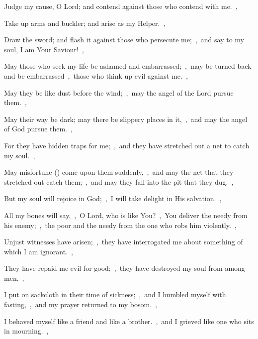 \documentclass[12pt,twoside,a5paper]{article}
\begin{document}



\begin{normalparskip}
  Judge my cause, O Lord; and contend against those who contend with me.~\sep

  Take up arms and buckler; and arise as my Helper.~\sep


  Draw the sword; and flash it against those who persecute me;~\sep\ and say to my soul, I am Your Saviour!~\sep

  May those who seek my life be ashamed and embarrassed;~\sep\ may be turned back and be embarrassed~\sep\ those who think up evil against me.~\sep

  May they be like dust before the wind;~\sep\ may the angel of the Lord pursue them.~\sep

  May their way be dark; may there be slippery places in it,~\sep\ and may the angel of God pursue them.~\sep

  For they have hidden traps for me;~\sep\ and they have stretched out a net to catch my soul.~\sep

  May misfortune () come upon them suddenly,~\sep\ and may the net that they stretched out catch them;~\sep\ and may they fall into the pit that they dug.~\sep

  But my soul will rejoice in God;~\sep\ I will take delight in His salvation.~\sep

  All my bones will say,~\sep\ O Lord, who is like You?~\sep\ You deliver the needy from his enemy;~\sep\ the poor and the needy from the one who robs him violently.~\sep

  Unjust witnesses have arisen;~\sep\ they have interrogated me about something of which I am ignorant.~\sep

  They have repaid me evil for good;~\sep\ they have destroyed my soul from among men.~\sep

  I put on sackcloth in their time of sickness;~\sep\ and I humbled myself with fasting,~\sep\ and my prayer returned to my bosom.~\sep

  I behaved myself like a friend and like a brother.~\sep\ and I grieved like one who sits in mourning.~\sep


\end{normalparskip}
\end{document}
